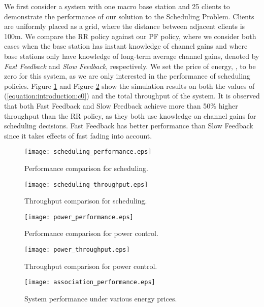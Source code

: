 \documentclass[conference]{IEEEtran}
\begin{document}
We first consider a system with one macro base station and 25 clients to demonstrate the performance of our solution to the Scheduling Problem. Clients are uniformly placed as a  grid, where the distance between adjacent clients is 100m. We compare the RR policy against our PF policy, where we consider both cases when the base station has instant knowledge of channel gains and where base stations only have knowledge of long-term average channel gains, denoted by \emph{Fast Feedback} and \emph{Slow Feedback}, respectively. We set the price of energy, , to be zero for this system, as we are only interested in the performance of {scheduling} policies. Figure \ref{fig:scheduling_performance} and Figure \ref{fig:scheduling_throughput} show the simulation results on both the values of (\ref{equation:introduction:c0}) and the total throughput of the system. It is observed that both Fast Feedback and Slow Feedback achieve more than 50\% higher throughput than the RR policy, as they both use knowledge on channel gains for scheduling decisions. Fast Feedback has better performance than Slow Feedback since it takes effects of fast fading into account.

\begin{figure}[t]
\centering
\texttt{[image: scheduling\_performance.eps]}
\caption{Performance comparison for scheduling.}
\label{fig:scheduling_performance}
\end{figure}

\begin{figure}[t]
\centering
\texttt{[image: scheduling\_throughput.eps]}
\caption{Throughput comparison for scheduling.}
\label{fig:scheduling_throughput}
\end{figure}

\begin{figure}[t]
\centering
\texttt{[image: power\_performance.eps]}
\caption{Performance comparison for power control.}
\label{fig:power_performance}
\end{figure}

\begin{figure}[t]
\centering
\texttt{[image: power\_throughput.eps]}
\caption{Throughput comparison for power control.}
\label{fig:power_throughput}
\end{figure}

\begin{figure}[t]
\centering
\texttt{[image: association\_performance.eps]}
\caption{System performance under various energy prices.}
\label{fig:association_performance}
\end{figure}
\end{document}
